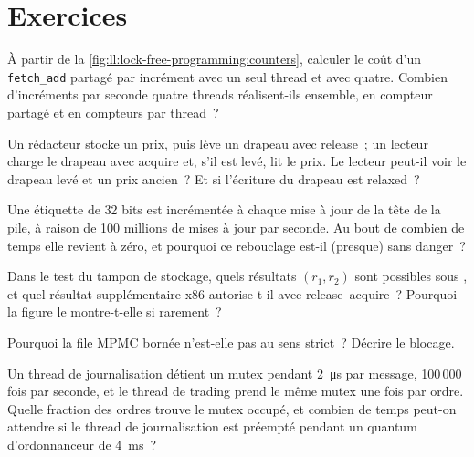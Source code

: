 \section{Exercices}

\begin{exercise}[$\star$]\label{exo:ll:lock-free-programming:1}
À partir de la \cref{fig:ll:lock-free-programming:counters}, calculer le coût d'un \texttt{fetch\_add} partagé par incrément avec un seul thread
et avec quatre. Combien d'incréments par seconde quatre threads réalisent-ils ensemble, en compteur partagé et en compteurs par thread~?
\end{exercise}

\begin{exercise}[$\star$]\label{exo:ll:lock-free-programming:2}
Un rédacteur stocke un prix, puis lève un drapeau avec release~; un lecteur charge le drapeau avec acquire et, s'il est levé, lit le prix.
Le lecteur peut-il voir le drapeau levé et un prix ancien~? Et si l'écriture du drapeau est relaxed~?
\end{exercise}

\begin{exercise}[$\star$]\label{exo:ll:lock-free-programming:3}
Une étiquette de 32 bits est incrémentée à chaque mise à jour de la tête de la pile, à raison de 100 millions de mises à jour par seconde. Au bout de combien de temps elle revient à zéro,
et pourquoi ce rebouclage est-il (presque) sans danger~?
\end{exercise}

\begin{exercise}[$\star\star$]\label{exo:ll:lock-free-programming:4}
Dans le test du tampon de stockage, quels résultats $(r_1, r_2)$ sont possibles sous , et quel résultat supplémentaire x86
autorise-t-il avec release--acquire~? Pourquoi la figure le montre-t-elle si rarement~?
\end{exercise}

\begin{exercise}[$\star\star$]\label{exo:ll:lock-free-programming:5}
Pourquoi la file MPMC bornée n'est-elle pas  au sens strict~? Décrire le blocage.
\end{exercise}

\begin{exercise}[$\star\star$]\label{exo:ll:lock-free-programming:6}
Un thread de journalisation détient un mutex pendant \qty{2}{\micro\second} par message, 100\,000 fois par seconde, et le thread de trading prend le
même mutex une fois par ordre. Quelle fraction des ordres trouve le mutex occupé, et combien de temps peut-on attendre si le
thread de journalisation est préempté pendant un quantum d'ordonnanceur de \qty{4}{\milli\second}~?
\end{exercise}

